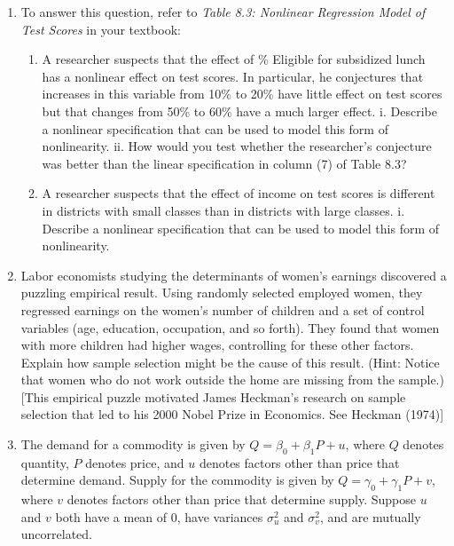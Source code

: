 \documentclass[11pt]{article}
\begin{document}
\begin{enumerate}
\item
  To answer this question, refer to \emph{Table 8.3: Nonlinear
  Regression Model of Test Scores} in your textbook:


\begin{enumerate}
\def\labelenumi{\alph{enumi}.}

\item
  A researcher suspects that the effect of \% Eligible for subsidized
  lunch has a nonlinear effect on test scores. In particular, he
  conjectures that increases in this variable from 10\% to 20\% have
  little effect on test scores but that changes from 50\% to 60\% have a
  much larger effect. i. Describe a nonlinear specification that can be
  used to model this form of nonlinearity. ii. How would you test
  whether the researcher's conjecture was better than the linear
  specification in column (7) of Table 8.3?
\item
  A researcher suspects that the effect of income on test scores is
  different in districts with small classes than in districts with large
  classes. i. Describe a nonlinear specification that can be used to
  model this form of nonlinearity.
\end{enumerate}



\item
  Labor economists studying the determinants of women's earnings
  discovered a puzzling empirical result. Using randomly selected
  employed women, they regressed earnings on the women's number of
  children and a set of control variables (age, education, occupation,
  and so forth). They found that women with more children had higher
  wages, controlling for these other factors. Explain how sample
  selection might be the cause of this result. (Hint: Notice that women
  who do not work outside the home are missing from the sample.) {[}This
  empirical puzzle motivated James Heckman's research on sample
  selection that led to his 2000 Nobel Prize in Economics. See Heckman
  (1974){]}


\item
  The demand for a commodity is given by
  \(Q = \beta_0 + \beta_1 P + u\), where \(Q\) denotes quantity, \(P\)
  denotes price, and \(u\) denotes factors other than price that
  determine demand. Supply for the commodity is given by
  \(Q = \gamma_0 + \gamma_1P + v\), where \(v\) denotes factors other
  than price that determine supply. Suppose \(u\) and \(v\) both have a
  mean of 0, have variances \(\sigma^2_u\) and \(\sigma^2_v\), and are
  mutually uncorrelated.


\end{enumerate}
\end{document}
